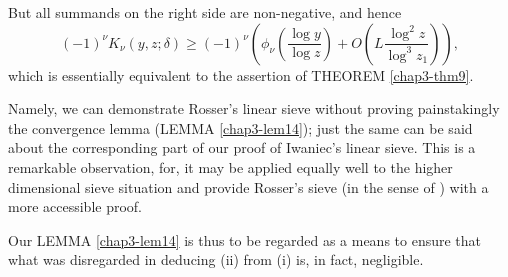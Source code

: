 But all summands on the right side are non-negative, and hence
\begin{equation*}
  (-1)^\nu K_\nu (y, z; \delta ) \geq (-1)^\nu \left(\phi_\nu \left(\frac{\log
    y}{\log z}\right) + O\left( L \frac{\log^2 z}{\log^3
    z_1}\right)\right),\tag{ii}  
\end{equation*}
which is essentially equivalent to the assertion of THEOREM
\ref{chap3-thm9}. 

Namely, we can demonstrate Rosser's linear sieve without proving
painstakingly the convergence lemma (LEMMA \ref{chap3-lem14}); just
the same can be 
said about the corresponding part of our proof of Iwaniec's linear
sieve. This is a remarkable observation, for, it may be applied
equally well to the higher dimensional sieve situation and provide
Rosser's sieve (in the sense of \cite{key30}) with a more accessible proof. 

Our LEMMA \ref{chap3-lem14} is thus to be regarded as a means to
ensure that what 
was disregarded in deducing (ii) from (i) is, in fact, negligible.  
